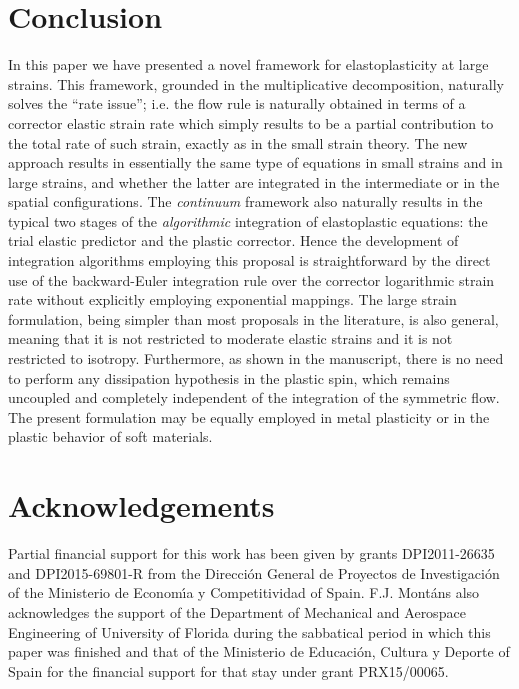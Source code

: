 \documentclass[preprint,review,12pt,sort&compress]{elsarticle}%
\begin{document}
\section{Conclusion}

In this paper we have presented a novel framework for elastoplasticity at
large strains. This framework, grounded in the multiplicative decomposition,
naturally solves the \textquotedblleft rate issue\textquotedblright; i.e. the
flow rule is naturally obtained in terms of a corrector elastic strain rate
which simply results to be a partial contribution to the total rate of such
strain, exactly as in the small strain theory. The new approach results in
essentially the same type of equations in small strains and in large strains,
and whether the latter are integrated in the intermediate or in the spatial
configurations. The \emph{continuum }framework also naturally results in the
typical two stages of the \emph{algorithmic} integration of elastoplastic
equations: the trial elastic predictor and the plastic corrector. Hence the
development of integration algorithms employing this proposal is
straightforward by the direct use of the backward-Euler integration rule over
the corrector logarithmic strain rate without explicitly employing exponential
mappings. The large strain formulation, being simpler than most proposals in
the literature, is also general, meaning that it is not restricted to moderate
elastic strains and it is not restricted to isotropy. Furthermore, as shown in
the manuscript, there is no need to perform any dissipation hypothesis in the
plastic spin, which remains uncoupled and completely independent of the
integration of the symmetric flow. The present formulation may be equally
employed in metal plasticity or in the plastic behavior of soft materials.

\section*{Acknowledgements}

Partial financial support for this work has been given by grants DPI2011-26635
and DPI2015-69801-R from the Direcci\'{o}n General de Proyectos de
Investigaci\'{o}n of the Ministerio de Econom\'{\i}a y Competitividad of
Spain. F.J. Mont\'{a}ns also acknowledges the support of the Department of
Mechanical and Aerospace Engineering of University of Florida during the
sabbatical period in which this paper was finished and that of the Ministerio
de Educaci\'{o}n, Cultura y Deporte of Spain for the financial support for
that stay under grant PRX15/00065.
\end{document}
